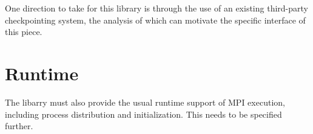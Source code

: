 \documentclass{article}
\begin{document}
One direction to take for this library is through the use of an existing third-party checkpointing system, the analysis of which can motivate the specific interface of this piece. 

\section{Runtime}

The libarry must also provide the usual runtime support of MPI execution, including process distribution and initialization.  This needs to be specified further.

\pagebreak
\listoftodos
\end{document}
